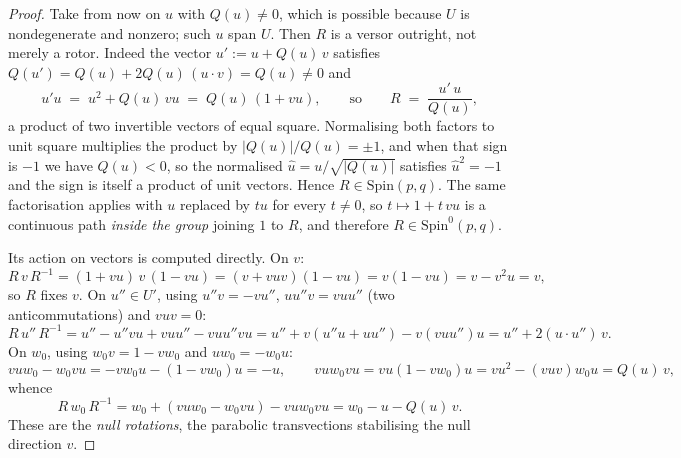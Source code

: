 \documentclass[11pt]{article}
\theoremstyle{definition}
\theoremstyle{plain}
\providecommand{\Spin}{}\renewcommand{\Spin}{\mathrm{Spin}}
\begin{document}
\begin{proof}
Take from now on $u$ with $Q(u) \neq 0$, which is possible because $U$ is nondegenerate and nonzero; such $u$ span $U$. Then $R$ is a versor outright, not merely a rotor. Indeed the vector $u' \mathrel{:=} u + Q(u)\,v$ satisfies $Q(u') = Q(u) + 2Q(u)\,(u \cdot v) = Q(u) \neq 0$ and
\begin{equation}\label{eq:versorfactor}
u'u \;=\; u^2 + Q(u)\,vu \;=\; Q(u)\,(1 + vu), \qquad \text{so} \qquad R \;=\; \frac{u'\,u}{Q(u)},
\end{equation}
a product of two invertible vectors of equal square. Normalising both factors to unit square multiplies the product by $|Q(u)|/Q(u) = \pm 1$, and when that sign is $-1$ we have $Q(u) < 0$, so the normalised $\hat{u} = u/\sqrt{|Q(u)|}$ satisfies $\hat{u}^2 = -1$ and the sign is itself a product of unit vectors. Hence $R \in \Spin(p,q)$. The same factorisation applies with $u$ replaced by $tu$ for every $t \neq 0$, so $t \mapsto 1 + t\,vu$ is a continuous path \emph{inside the group} joining $1$ to $R$, and therefore $R \in \Spin^0(p,q)$.

Its action on vectors is computed directly. On $v$:
\[
R\,v\,R^{-1} = (1 + vu)\,v\,(1 - vu) = (v + vuv)(1 - vu) = v(1 - vu) = v - v^2u = v ,
\]
so $R$ fixes $v$. On $u'' \in U'$, using $u''v = -vu''$, $u u'' v = v u u''$ (two anticommutations) and $vuv = 0$:
\[
R\,u''\,R^{-1} = u'' - u''vu + vuu'' - vuu''vu = u'' + v(u''u + uu'') - v(vuu'')u = u'' + 2(u \cdot u'')\,v .
\]
On $w_0$, using $w_0 v = 1 - v w_0$ and $u w_0 = -w_0 u$:
\[
vuw_0 - w_0vu = -vw_0u - (1 - vw_0)u = -u, \qquad
vuw_0vu = vu(1 - vw_0)u = vu^2 - (vuv)w_0u = Q(u)\,v,
\]
whence
\[
R\,w_0\,R^{-1} = w_0 + (vuw_0 - w_0vu) - vuw_0vu = w_0 - u - Q(u)\,v .
\]
These are the \emph{null rotations}, the parabolic transvections stabilising the null direction $v$.


\end{proof}
\end{document}
